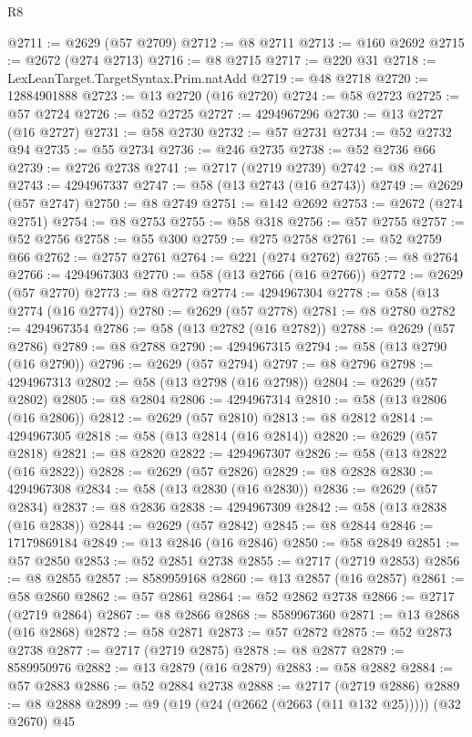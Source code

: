 \begin{lexlean}{R8}
\begin{coremodule}
@2711 := @2629 (@57 @2709)
@2712 := @8 @2711
@2713 := @160 @2692
@2715 := @2672 (@274 @2713)
@2716 := @8 @2715
@2717 := @220 @31
@2718 := LexLeanTarget.TargetSyntax.Prim.natAdd
@2719 := @48 @2718
@2720 := 12884901888
@2723 := @13 @2720 (@16 @2720)
@2724 := @58 @2723
@2725 := @57 @2724
@2726 := @52 @2725
@2727 := 4294967296
@2730 := @13 @2727 (@16 @2727)
@2731 := @58 @2730
@2732 := @57 @2731
@2734 := @52 @2732 @94
@2735 := @55 @2734
@2736 := @246 @2735
@2738 := @52 @2736 @66
@2739 := @2726 @2738
@2741 := @2717 (@2719 @2739)
@2742 := @8 @2741
@2743 := 4294967337
@2747 := @58 (@13 @2743 (@16 @2743))
@2749 := @2629 (@57 @2747)
@2750 := @8 @2749
@2751 := @142 @2692
@2753 := @2672 (@274 @2751)
@2754 := @8 @2753
@2755 := @58 @318
@2756 := @57 @2755
@2757 := @52 @2756
@2758 := @55 @300
@2759 := @275 @2758
@2761 := @52 @2759 @66
@2762 := @2757 @2761
@2764 := @221 (@274 @2762)
@2765 := @8 @2764
@2766 := 4294967303
@2770 := @58 (@13 @2766 (@16 @2766))
@2772 := @2629 (@57 @2770)
@2773 := @8 @2772
@2774 := 4294967304
@2778 := @58 (@13 @2774 (@16 @2774))
@2780 := @2629 (@57 @2778)
@2781 := @8 @2780
@2782 := 4294967354
@2786 := @58 (@13 @2782 (@16 @2782))
@2788 := @2629 (@57 @2786)
@2789 := @8 @2788
@2790 := 4294967315
@2794 := @58 (@13 @2790 (@16 @2790))
@2796 := @2629 (@57 @2794)
@2797 := @8 @2796
@2798 := 4294967313
@2802 := @58 (@13 @2798 (@16 @2798))
@2804 := @2629 (@57 @2802)
@2805 := @8 @2804
@2806 := 4294967314
@2810 := @58 (@13 @2806 (@16 @2806))
@2812 := @2629 (@57 @2810)
@2813 := @8 @2812
@2814 := 4294967305
@2818 := @58 (@13 @2814 (@16 @2814))
@2820 := @2629 (@57 @2818)
@2821 := @8 @2820
@2822 := 4294967307
@2826 := @58 (@13 @2822 (@16 @2822))
@2828 := @2629 (@57 @2826)
@2829 := @8 @2828
@2830 := 4294967308
@2834 := @58 (@13 @2830 (@16 @2830))
@2836 := @2629 (@57 @2834)
@2837 := @8 @2836
@2838 := 4294967309
@2842 := @58 (@13 @2838 (@16 @2838))
@2844 := @2629 (@57 @2842)
@2845 := @8 @2844
@2846 := 17179869184
@2849 := @13 @2846 (@16 @2846)
@2850 := @58 @2849
@2851 := @57 @2850
@2853 := @52 @2851 @2738
@2855 := @2717 (@2719 @2853)
@2856 := @8 @2855
@2857 := 8589959168
@2860 := @13 @2857 (@16 @2857)
@2861 := @58 @2860
@2862 := @57 @2861
@2864 := @52 @2862 @2738
@2866 := @2717 (@2719 @2864)
@2867 := @8 @2866
@2868 := 8589967360
@2871 := @13 @2868 (@16 @2868)
@2872 := @58 @2871
@2873 := @57 @2872
@2875 := @52 @2873 @2738
@2877 := @2717 (@2719 @2875)
@2878 := @8 @2877
@2879 := 8589950976
@2882 := @13 @2879 (@16 @2879)
@2883 := @58 @2882
@2884 := @57 @2883
@2886 := @52 @2884 @2738
@2888 := @2717 (@2719 @2886)
@2889 := @8 @2888
@2899 := @9 (@19 (@24 (@2662 (@2663 (@11 @132 @25))))) (@32 @2670) @45

\end{coremodule}
\end{lexlean}
